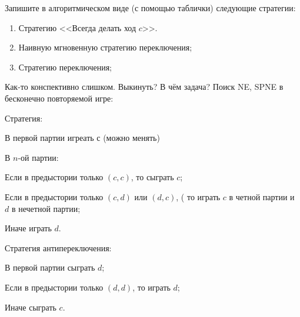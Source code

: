 \begin{problem}

Запишите в алгоритмическом виде (с помощью таблички) следующие стратегии:
\begin{enumerate}
\item  Стратегию <<Всегда делать ход  $c$>>.\par
\item Наивную мгновенную стратегию переключения;\par
\item  Стратегию переключения;
\end{enumerate}


\begin{sol}

\end{sol}
\end{problem}



\begin{problem}
{\red Как-то конспективно слишком. Выкинуть? В чём задача?}
 Поиск NE, SPNE в бесконечно повторяемой игре: \par
Стратегия: \par
В первой партии игреать с (можно менять) \par
В $n$-ой партии:\par
Если в предыстории только $(c,c)$, то сыграть $c$; \par
Если в предыстории только $(c,d)$ или $(d,c)$, ( то играть $c$ в
четной партии и
$d$ в нечетной партии; \par
Иначе играть $d$. \par

Стратегия антипереключения: \par
В первой партии сыграть $d$; \par
Если в предыстории только $(d,d)$, то играть $d$; \par
Иначе сыграть $c$.



\begin{sol}

\end{sol}
\end{problem}




